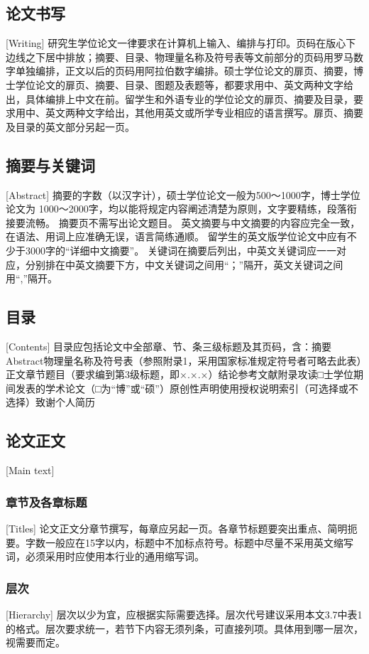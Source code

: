 \subsection{论文书写}[Writing]
研究生学位论文一律要求在计算机上输入、编排与打印。页码在版心下边线之下居中排放；摘要、目录、物理量名称及符号表等文前部分的页码用罗马数字单独编排，正文以后的页码用阿拉伯数字编排。硕士学位论文的扉页、摘要，博士学位论文的扉页、摘要、目录、图题及表题等，都要求用中、英文两种文字给出，具体编排上中文在前。留学生和外语专业的学位论文的扉页、摘要及目录，要求用中、英文两种文字给出，其他用英文或所学专业相应的语言撰写。扉页、摘要及目录的英文部分另起一页。

\subsection{摘要与关键词}[Abstract]
摘要的字数（以汉字计），硕士学位论文一般为500～\num{1000}字，博士学位论文为
\num{1000}～\num{2000}字，均以能将规定内容阐述清楚为原则，文字要精练，段落衔
接要流畅。
摘要页不需写出论文题目。
英文摘要与中文摘要的内容应完全一致，在语法、用词上应准确无误，语言简练通顺。
留学生的英文版学位论文中应有不少于\num{3000}字的“详细中文摘要”。
关键词在摘要后列出，中英文关键词应一一对应，分别排在中英文摘要下方，中文关键词之间用“；”隔开，英文关键词之间用“,”隔开。

\subsection{目录}[Contents]
目录应包括论文中全部章、节、条三级标题及其页码，含：摘要Abstract物理量名称及符号表（参照附录1，采用国家标准规定符号者可略去此表）正文章节题目（要求编到第3级标题，即×.×.×）结论参考文献附录攻读□士学位期间发表的学术论文（□为“博”或“硕”）原创性声明使用授权说明索引（可选择或不选择）致谢个人简历

\subsection{论文正文}[Main text]
\subsubsection{章节及各章标题}[Titles]
论文正文分章节撰写，每章应另起一页。各章节标题要突出重点、简明扼要。字数一般应在15字以内，标题中不加标点符号。标题中尽量不采用英文缩写词，必须采用时应使用本行业的通用缩写词。

\subsubsection{层次}[Hierarchy]
层次以少为宜，应根据实际需要选择。层次代号建议采用本文3.7中表1的格式。层次要求统一，若节下内容无须列条，可直接列项。具体用到哪一层次，视需要而定。

